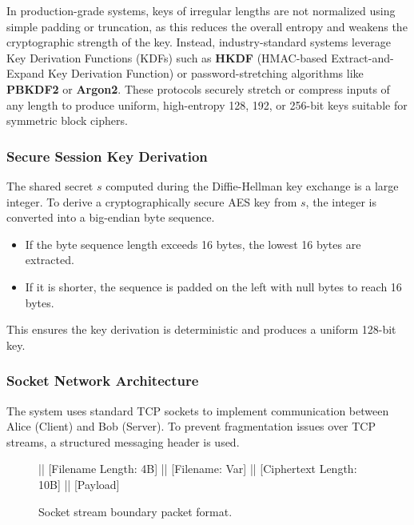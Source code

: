 \documentclass[11pt,a4paper]{article}
\begin{document}
\begin{tcolorbox}[colback=NavyBlue!4!white, colframe=NavyBlue!35, arc=4pt, boxrule=0.8pt, left=12pt, right=12pt, top=10pt, bottom=10pt, enhanced, drop shadow={NavyBlue!8}, title={\sffamily\bfseries\color{BoxTitle} Production-Grade Key Derivation Note}]
    \small In production-grade systems, keys of irregular lengths are not normalized using simple padding or truncation, as this reduces the overall entropy and weakens the cryptographic strength of the key. Instead, industry-standard systems leverage Key Derivation Functions (KDFs) such as \textbf{HKDF} (HMAC-based Extract-and-Expand Key Derivation Function) or password-stretching algorithms like \textbf{PBKDF2} or \textbf{Argon2}. These protocols securely stretch or compress inputs of any length to produce uniform, high-entropy 128, 192, or 256-bit keys suitable for symmetric block ciphers.
\end{tcolorbox}

\subsubsection{Secure Session Key Derivation}
The shared secret $s$ computed during the Diffie-Hellman key exchange is a large integer. To derive a cryptographically secure AES key from $s$, the integer is converted into a big-endian byte sequence.
\begin{itemize}
    \item If the byte sequence length exceeds 16 bytes, the lowest 16 bytes are extracted.
    \item If it is shorter, the sequence is padded on the left with null bytes to reach 16 bytes.
\end{itemize}
This ensures the key derivation is deterministic and produces a uniform 128-bit key.

\subsubsection{Socket Network Architecture}
The system uses standard TCP sockets to implement communication between Alice (Client) and Bob (Server). To prevent fragmentation issues over TCP streams, a structured messaging header is used.
\begin{figure}[H]
    \centering
    \begin{tcolorbox} || [Filename Length: 4B] || [Filename: Var] || [Ciphertext Length: 10B] || [Payload]
    \end{tcolorbox}
    \caption{Socket stream boundary packet format.}
\end{figure}
\end{document}
